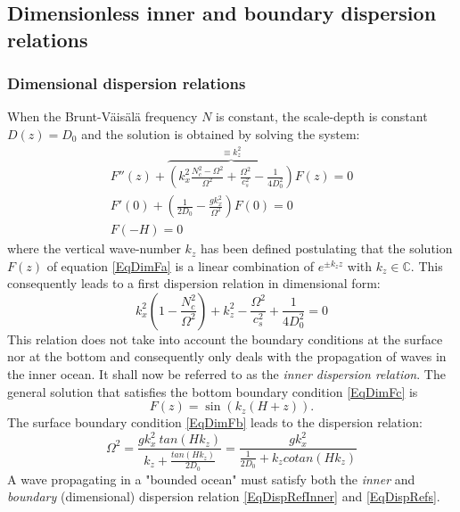 \documentclass[a4paper,11pt]{article}
\begin{document}
\subsection{Dimensionless inner and boundary dispersion relations}
 \label{SubSectionDisp}
 \subsubsection{Dimensional dispersion relations}
When the Brunt-V\"ais\"al\"a frequency $N$ is constant, the scale-depth is constant $D(z)=D_0$ and the solution is obtained by solving the system:
\begin{subequations}
	\label{EqDimF}
	\begin{alignat}{2}	
    \displaystyle
	\label{EqDimFa}
    F''(z)
    +
   \overbrace{ \left(k_x^2\frac{N_c^2-\Omega^2}{\Omega^2}+\frac{\Omega^2}{c_s^2}-\frac{1}{4D_0^2}\right)}^{\equiv k_z^2}
    F(z)=0\\[4mm]
	\label{EqDimFb}
    \displaystyle
    F'(0)+\left(
    \frac{1}{2D_0}-\frac{gk_x^2}{\Omega^2}
    \right)F(0)=0\\[4mm]
	\label{EqDimFc}
    \displaystyle
    F(-H)=0
  \end{alignat}
\end{subequations}
where the vertical wave-number $k_z$ has been defined postulating that the solution $F(z)$ of equation \ref{EqDimFa} is a linear combination of $e^{\pm k_z z}$ with $k_z\in \mathbb{C}$. This consequently leads to a first dispersion relation in dimensional form:
\begin{equation}
  \label{EqDispRefInner}
  \displaystyle
   k_x^2\left(1-\frac{N_c^2}{\Omega^2}\right)+k_z^2
   -\frac{\Omega^2}{c_s^2}+\frac{1}{4D_0^2}=0
\end{equation}
This relation does not take into account the boundary conditions at the surface nor at the bottom and consequently only deals with the propagation of waves in the inner ocean. It shall now be referred to as the \textit{inner dispersion relation}.
The general solution that satisfies the bottom boundary condition \ref{EqDimFc} is
\begin{equation}
	\label{EqDispRef}
  	\displaystyle
  	F(z)=\sin\left(k_z(H+z)\right).
\end{equation}
The surface boundary condition \ref{EqDimFb} leads to the dispersion relation:
\begin{equation}
	\label{EqDispRefs}
     \Omega^2 =\frac{gk_x^2\ tan(Hk_z)}{k_z +\frac{ tan(Hk_z)}{2 D_0 }}
    =\frac{gk_x^2 }{\frac{1}{ 2 D_0} + k_z cotan(Hk_z)}
\end{equation}
A wave propagating in a "bounded ocean" must satisfy both the \textit{inner} and \textit{boundary} (dimensional) dispersion relation \ref{EqDispRefInner} and \ref{EqDispRefs}.
\end{document}
